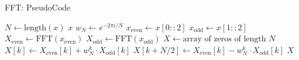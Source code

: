 \documentclass{beamer}
\newcommand{\beforeverb}{\footnotesize}
\newcommand{\afterverb}{\normalsize}
\begin{document}
\begin{frame}{FFT: PseudoCode}
\beforeverb
\begin{algorithmic}
    \State $N \gets \text{length}(x)$
        \State \Return $x$
    \EndIf
    \State $w_N \gets e^{-2\pi i / N}$
    \State $x_{\text{even}} \gets x[0::2]$
    \State $x_{\text{odd}} \gets x[1::2]$
    \State $X_{\text{even}} \gets \text{FFT}(x_{\text{even}})$
    \State $X_{\text{odd}} \gets \text{FFT}(x_{\text{odd}})$
    \State $X \gets \text{array of zeros of length } N$
        \State $X[k] \gets X_{\text{even}}[k] + w_N^k \cdot X_{\text{odd}}[k]$
        \State $X[k + N/2] \gets X_{\text{even}}[k] - w_N^k \cdot X_{\text{odd}}[k]$
    \EndFor
    \State \Return $X$
\EndProcedure
\end{algorithmic}
\afterverb
\end{frame}
\end{document}
